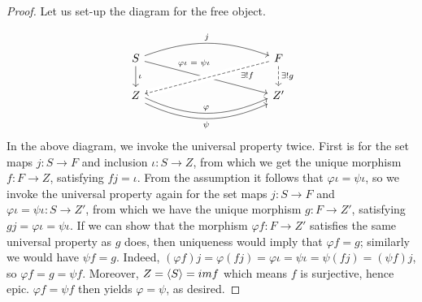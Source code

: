 \documentclass[12pt]{article}
\theoremstyle{definition}
\theoremstyle{plain}
\numberwithin{equation}{section}
\theoremstyle{definition}
\begin{document}
\begin{proof}
Let us set-up the diagram for the free object.

\[ \begin{tikzcd}[column sep=large]
	S \arrow[rrr, bend left = 20, "j"] \arrow[d, "\iota"] \arrow[drrr, near start, "\varphi \iota \text{ = } \psi \iota"] & & & F \arrow[dlll, dashed, near start, crossing over, "\exists !f"] \arrow[d, dashed, " \exists !g"]\\
	Z \arrow[rrr, shift left, bend right=25, "\varphi"] \arrow[rrr, shift right, bend right=25, "\psi"'] & & & Z' 
\end{tikzcd}\]
In the above diagram, we invoke the universal property twice. First is for the set maps $ j : S \to F $ and inclusion $ \iota : S \to Z $, from which we get the unique morphism $ f : F \to Z $, satisfying $ f j = \iota $. From the assumption it follows that $ \varphi \iota = \psi \iota $, so we invoke the universal property again for the set maps $ j : S \to F $ and $ \varphi \iota = \psi \iota : S \to Z' $, from which we have the unique morphism $ g : F \to Z' $, satisfying $ g j = \varphi \iota = \psi \iota $. If we can show that the morphism $ \varphi f : F \to Z' $ satisfies the same universal property as $ g $ does, then uniqueness would imply that $ \varphi f = g $; similarly we would have $ \psi f = g $. Indeed, $ (\varphi f) j = \varphi (f j) = \varphi \iota = \psi \iota = \psi (fj) = (\psi f) j$, so $ \varphi f = g = \psi f$. Moreover, $ Z = \langle S \rangle = im f $ which means $ f $ is surjective, hence epic. $ \varphi f = \psi f $ then yields $ \varphi = \psi $, as desired.
\end{proof}
\end{document}
